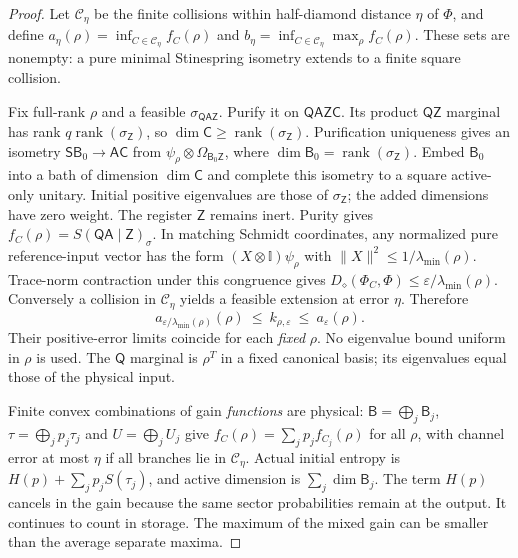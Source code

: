 \documentclass[11pt,a4paper]{article}
\numberwithin{equation}{section}
\theoremstyle{plain}
\theoremstyle{definition}
\DeclareMathOperator{\rank}{rank}
\newcommand{\rg}[1]{\mathsf{#1}}
\newcommand{\one}{\mathbb{I}}
\newcommand{\Ddiam}{D_{\diamond}}          %
\begin{document}
\begin{proof}
Let $\mathcal{C}_\eta$ be the finite collisions within half-diamond distance
$\eta$ of $\Phi$, and define
$a_\eta(\rho)=\inf_{C\in\mathcal{C}_\eta}f_C(\rho)$ and
$b_\eta=\inf_{C\in\mathcal{C}_\eta}\max_\rho f_C(\rho)$. These sets are
nonempty: a pure minimal Stinespring isometry extends to a finite square
collision.

Fix full-rank $\rho$ and a feasible $\sigma_{\rg{Q}\rg{A}\rg{Z}}$. Purify it
on $\rg{Q}\rg{A}\rg{Z}\rg{C}$. Its product $\rg{Q}\rg{Z}$ marginal has rank
$q\rank(\sigma_{\rg{Z}})$, so $\dim\rg{C}\ge\rank(\sigma_{\rg{Z}})$.
Purification uniqueness gives an isometry
$\rg{S}\rg{B}_0\to\rg{A}\rg{C}$ from
$\psi_\rho\otimes\Omega_{\rg{B}_0\rg{Z}}$, where
$\dim\rg{B}_0=\rank(\sigma_{\rg{Z}})$. Embed $\rg{B}_0$ into a bath of
dimension $\dim\rg{C}$ and complete this isometry to a square active-only
unitary. Initial positive eigenvalues are those of $\sigma_{\rg{Z}}$; the
added dimensions have zero weight. The register $\rg{Z}$ remains inert. Purity
gives $f_C(\rho)=S(\rg{Q}\rg{A}\mid\rg{Z})_\sigma$. In matching Schmidt
coordinates, any normalized pure reference-input vector has the form
$(X\otimes\one)\psi_\rho$ with $\lVert X\rVert^2\le 1/\lambda_{\min}(\rho)$.
Trace-norm contraction under this congruence gives
$\Ddiam(\Phi_C,\Phi)\le\varepsilon/\lambda_{\min}(\rho)$. Conversely a
collision in $\mathcal{C}_\eta$ yields a feasible extension at error $\eta$.
Therefore
\begin{equation}
\label{eq:lifting-sandwich}
a_{\varepsilon/\lambda_{\min}(\rho)}(\rho)\ \le\ k_{\rho,\varepsilon}\ \le\
a_\varepsilon(\rho).
\end{equation}
Their positive-error limits coincide for each \emph{fixed} $\rho$. No
eigenvalue bound uniform in $\rho$ is used. The $\rg{Q}$ marginal is $\rho^{T}$
in a fixed canonical basis; its eigenvalues equal those of the physical input.

Finite convex combinations of gain \emph{functions} are physical:
$\rg{B}=\bigoplus_j\rg{B}_j$, $\tau=\bigoplus_j p_j\tau_j$ and
$U=\bigoplus_j U_j$ give $f_C(\rho)=\sum_j p_j f_{C_j}(\rho)$ for all $\rho$,
with channel error at most $\eta$ if all branches lie in $\mathcal{C}_\eta$.
Actual initial entropy is $H(p)+\sum_j p_j S(\tau_j)$, and active dimension is
$\sum_j\dim\rg{B}_j$. The term $H(p)$ cancels in the gain because the same
sector probabilities remain at the output. It continues to count in storage.
The maximum of the mixed gain can be smaller than the average separate maxima.


\end{proof}
\end{document}
